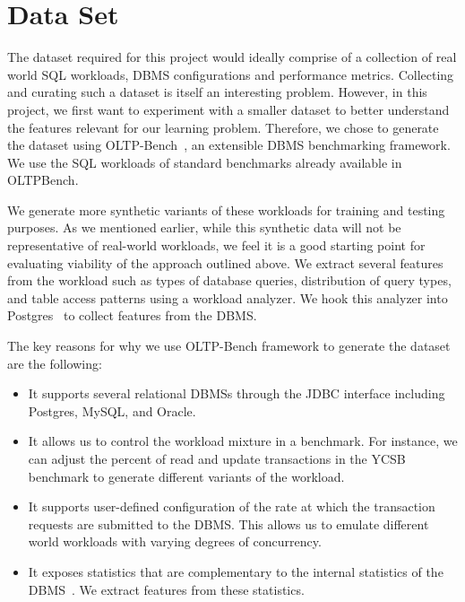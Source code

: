 \section{Data Set} \label{sec:data_set}

The dataset required for this project would ideally comprise of a 
collection of real world SQL workloads, DBMS configurations and performance
metrics. Collecting and curating such a dataset is itself an interesting
problem.
However, in this project, we first want to experiment with a smaller dataset
to better understand the features relevant for our learning problem.
Therefore, we chose to generate the dataset using
OLTP-Bench~\citep{oltpbench14}, an extensible DBMS benchmarking framework.
We use the SQL workloads of standard benchmarks already available
in OLTPBench. 

We generate more synthetic variants of these workloads for training and
testing purposes. As we mentioned earlier, while this synthetic data will not be
representative of real-world workloads, we feel it is a good starting point for
evaluating viability of the approach outlined above.
We extract several features from the workload such as types of database queries,
distribution of query types, and table access patterns using 
a workload analyzer. We hook this analyzer into Postgres~\citep{postgres91} to collect 
features from the DBMS.

The key reasons for why we use OLTP-Bench framework to generate the dataset 
are the following:

\begin{itemize}
  \item It supports several relational DBMSs through the JDBC interface
  including Postgres, MySQL, and Oracle.
  \item It allows us to control the workload mixture in a benchmark. For
  instance, we can adjust the percent of read and update transactions in 
  the YCSB~\citep{ycsb} benchmark to generate different variants of the workload.
  \item It supports user-defined configuration of the rate at which the
  transaction requests are submitted to the DBMS. This allows us to emulate
  different world workloads with varying degrees of concurrency.
  \item It exposes statistics that are complementary to the 
  internal statistics of the DBMS~\citep{postgres14}. We extract features from
  these statistics.
\end{itemize}

